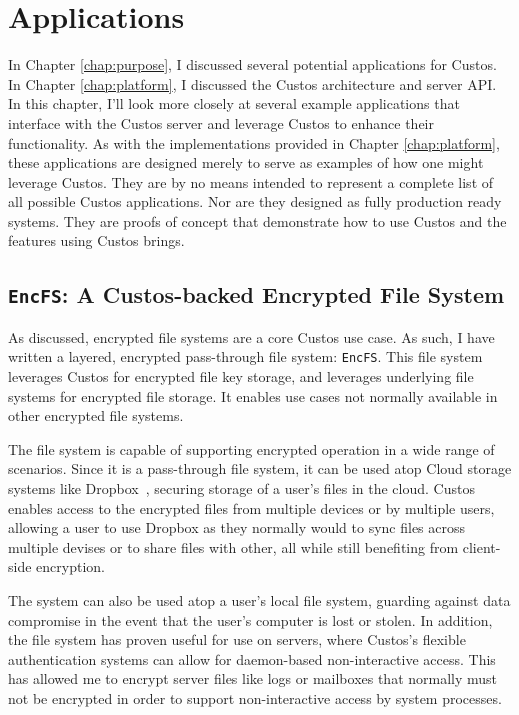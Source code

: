 \chapter{Applications}
\label{chap:clients}

In Chapter \ref{chap:purpose}, I discussed several potential
applications for Custos. In Chapter \ref{chap:platform}, I discussed
the Custos architecture and server API. In this chapter, I'll look
more closely at several example applications that interface with the
Custos server and leverage Custos to enhance their functionality. As
with the implementations provided in Chapter \ref{chap:platform},
these applications are designed merely to serve as examples of how one
might leverage Custos. They are by no means intended to represent a
complete list of all possible Custos applications. Nor are they
designed as fully production ready systems. They are proofs of concept
that demonstrate how to use Custos and the features using Custos
brings.

\section{\texttt{EncFS}: A Custos-backed Encrypted File System}

As discussed, encrypted file systems are a core Custos use case. As
such, I have written a layered, encrypted pass-through file system:
\texttt{EncFS}. This file system leverages Custos for encrypted file
key storage, and leverages underlying file systems for encrypted file
storage. It enables use cases not normally available in other
encrypted file systems.

The file system is capable of supporting encrypted operation in a wide
range of scenarios. Since it is a pass-through file system, it can be
used atop Cloud storage systems like Dropbox~\cite{dropbox}, securing
storage of a user's files in the cloud. Custos enables access to the
encrypted files from multiple devices or by multiple users, allowing a
user to use Dropbox as they normally would to sync files across
multiple devises or to share files with other, all while still
benefiting from client-side encryption.

The system can also be used atop a user's local file system, guarding
against data compromise in the event that the user's computer is lost
or stolen. In addition, the file system has proven useful for use on
servers, where Custos's flexible authentication systems can allow for
daemon-based non-interactive access. This has allowed me to encrypt
server files like logs or mailboxes that normally must not be
encrypted in order to support non-interactive access by system
processes.

